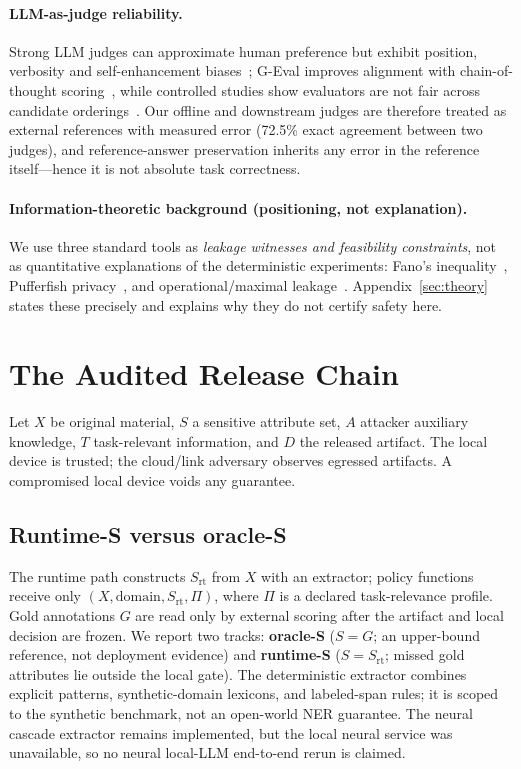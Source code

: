 \documentclass[journal]{IEEEtran}
\begin{document}
\paragraph{LLM-as-judge reliability.} Strong LLM judges can approximate human preference but exhibit position, verbosity and self-enhancement biases~\cite{zheng2023judging}; G-Eval improves alignment with chain-of-thought scoring~\cite{liu2023geval}, while controlled studies show evaluators are not fair across candidate orderings~\cite{wang2023fair}. Our offline and downstream judges are therefore treated as external references with measured error (72.5\% exact agreement between two judges), and reference-answer preservation inherits any error in the reference itself---hence it is not absolute task correctness.

\paragraph{Information-theoretic background (positioning, not explanation).} We use three standard tools as \emph{leakage witnesses and feasibility constraints}, not as quantitative explanations of the deterministic experiments: Fano's inequality~\cite{cover2006elements}, Pufferfish privacy~\cite{kifer2012rigorous,kifer2014pufferfish}, and operational/maximal leakage~\cite{issa2020operational}. Appendix~\ref{sec:theory} states these precisely and explains why they do not certify safety here.

\section{The Audited Release Chain}\label{sec:chain}

Let $X$ be original material, $S$ a sensitive attribute set, $A$ attacker auxiliary knowledge, $T$ task-relevant information, and $D$ the released artifact. The local device is trusted; the cloud/link adversary observes egressed artifacts. A compromised local device voids any guarantee.

\subsection{Runtime-S versus oracle-S}
The runtime path constructs $S_{\mathrm{rt}}$ from $X$ with an extractor; policy functions receive only $(X,\mathrm{domain},S_{\mathrm{rt}},\Pi)$, where $\Pi$ is a declared task-relevance profile. Gold annotations $G$ are read only by external scoring after the artifact and local decision are frozen. We report two tracks: \textbf{oracle-S} ($S=G$; an upper-bound reference, not deployment evidence) and \textbf{runtime-S} ($S=S_{\mathrm{rt}}$; missed gold attributes lie outside the local gate). The deterministic extractor combines explicit patterns, synthetic-domain lexicons, and labeled-span rules; it is scoped to the synthetic benchmark, not an open-world NER guarantee. The neural cascade extractor remains implemented, but the local neural service was unavailable, so no neural local-LLM end-to-end rerun is claimed.
\end{document}
